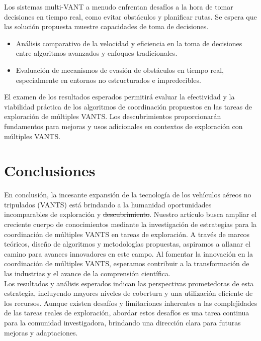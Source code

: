 \documentclass[sigconf]{acmart}
\providecommand{\DIFadd}[1]{{\protect\color{blue}\uwave{#1}}} %
\providecommand{\DIFdel}[1]{{\protect\color{red}\sout{#1}}}                      %
\providecommand{\DIFaddbegin}{} %
\providecommand{\DIFaddend}{} %
\providecommand{\DIFdelbegin}{} %
\providecommand{\DIFdelend}{} %
\begin{document}
Los sistemas multi-VANT a menudo enfrentan desafíos a la hora de tomar decisiones en tiempo real, como evitar obstáculos y planificar rutas. Se espera que las solución propuesta muestre capacidades de toma de decisiones.

\begin{itemize}
\item Análisis comparativo de la velocidad y eficiencia en la toma de decisiones entre algoritmos avanzados y enfoques tradicionales.
\item Evaluación de mecanismos de evasión de obstáculos en tiempo real, especialmente en entornos no estructurados e impredecibles.
\end{itemize}

El examen de los resultados esperados permitirá evaluar la efectividad y la viabilidad práctica de los algoritmos de coordinación propuestos en las tareas de exploración de múltiples VANTS. Los descubrimientos proporcionarán fundamentos para mejoras y usos adicionales en contextos de exploración con múltiples VANTS.

\section{Conclusiones}

En conclusión, la incesante expansión de la tecnología de los vehículos aéreos no tripulados (VANTS) está brindando a la humanidad oportunidades incomparables \DIFaddbegin \DIFadd{para utilizarlos en tareas }\DIFaddend de exploración y \DIFdelbegin \DIFdel{descubrimiento}\DIFdelend \DIFaddbegin \DIFadd{vigilancia}\DIFaddend . Nuestro artículo busca ampliar el creciente cuerpo de conocimientos mediante la investigación de estrategias para la coordinación de múltiples VANTS en tareas de exploración. A través de marcos teóricos, diseño de algoritmos y metodologías propuestas, aspiramos a allanar el camino para avances innovadores en este campo. Al fomentar la innovación en la coordinación de múltiples VANTS, esperamos contribuir a la transformación de las industrias y el avance de la comprensión científica.\\

Los resultados y análisis esperados indican las perspectivas prometedoras de esta estrategia, incluyendo mayores niveles de cobertura y una utilización eficiente de los recursos. Aunque existen desafíos y limitaciones inherentes a las complejidades de las tareas reales de exploración, abordar estos desafíos es una tarea continua para la comunidad investigadora, brindando una dirección clara para futuras mejoras y adaptaciones.\\
\end{document}

